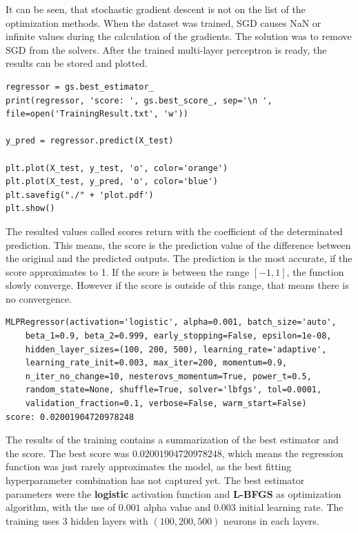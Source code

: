 It can be seen, that stochastic gradient descent is not on the list of the optimization methods. When the dataset was trained, SGD causes NaN or infinite values during the calculation of the gradients. The solution was to remove SGD from the solvers. After the trained multi-layer perceptron is ready, the results can be stored and plotted. 
\begin{lstlisting}
regressor = gs.best_estimator_
print(regressor, 'score: ', gs.best_score_, sep='\n ', file=open('TrainingResult.txt', 'w'))

y_pred = regressor.predict(X_test)

plt.plot(X_test, y_test, 'o', color='orange')
plt.plot(X_test, y_pred, 'o', color='blue')
plt.savefig("./" + 'plot.pdf')
plt.show()
\end{lstlisting}

\medskip The resulted values called scores return with the coefficient of the determinated prediction. This means, the score is the prediction value of the difference between the original and the predicted outputs. The prediction is the most accurate, if the score approximates to 1. If the score is between the range $[-1, 1]$, the function slowly converge. However if the score is outside of this range, that means there is no convergence. 
\begin{lstlisting}
MLPRegressor(activation='logistic', alpha=0.001, batch_size='auto',
	beta_1=0.9, beta_2=0.999, early_stopping=False, epsilon=1e-08,
	hidden_layer_sizes=(100, 200, 500), learning_rate='adaptive',
	learning_rate_init=0.003, max_iter=200, momentum=0.9,
	n_iter_no_change=10, nesterovs_momentum=True, power_t=0.5,
	random_state=None, shuffle=True, solver='lbfgs', tol=0.0001,
	validation_fraction=0.1, verbose=False, warm_start=False)
score: 0.02001904720978248
\end{lstlisting}

The results of the training contains a summarization of the best estimator and the score. The best score was $0.02001904720978248$, which means the regression function was just rarely approximates the model, as the best fitting hyperparameter combination has not captured yet. The best estimator parameters were the \textbf{logistic} activation function and \textbf{L-BFGS} as optimization algorithm, with the use of $0.001$ alpha value and $0.003$ initial learning rate. The training uses $3$ hidden layers with $(100,200,500)$ neurons in each layers.\medskip

